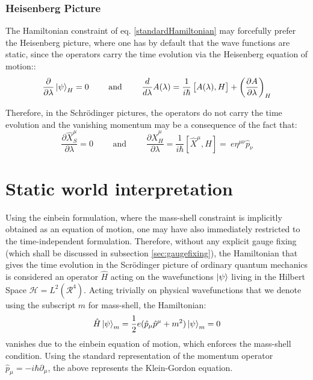 \documentclass[a4paper,10pt]{article}
\numberwithin{equation}{section}
\begin{document}
\subsubsection{Heisenberg Picture}

The Hamiltonian constraint of eq. \ref{standardHamiltonian} may forcefully prefer the Heisenberg picture, where one has by default that the wave functions are static, since the operators carry the time evolution via the Heisenberg equation of motion::
\begin{equation}
    \frac{\partial}{\partial \lambda} \ket{\psi}_H =0  \qquad \text{ and } \qquad \frac{d}{d\lambda}A(\lambda) = \frac{1}{i\hbar} \left[A(\lambda), H\right] + \left(\frac{\partial A}{\partial \lambda} \right)_H
    \label{heisenbergpicture}
\end{equation}


Therefore, in the Schr{\"o}dinger pictures, the operators do not carry the time evolution and the vanishing momentum may be a consequence of the fact that:
\begin{equation}
    \frac{\partial \hat{X}_S^\mu}{\partial \lambda} = 0 \qquad \text{ and } \qquad  \frac{\partial \hat{X}_H^\mu}{\partial \lambda} = \frac{1}{i\hbar} \left[ \hat{X}^\mu, H \right]=  \ e \eta^{\mu\nu} \hat{p}_\nu
\end{equation}

\newpage

\section{Static world interpretation}
\label{sec:staticworldinterpretation}
Using the einbein formulation, where the mass-shell constraint is implicitly obtained as an equation of motion, one may have also immediately restricted to the time-independent formulation. Therefore, without any explicit gauge fixing (which shall be discussed in subsection \ref{sec:gaugefixing}), the Hamiltonian that gives the time evolution in the Scr{\"o}dinger picture of ordinary quantum mechanics is considered an operator $\hat{H}$ acting on the wavefunctions $\ket{\psi}$ living in the Hilbert Space $\mathcal{H}= L^2(\mathcal{R}^4)$. Acting trivially on physical wavefunctions that we denote using the subscript $m$ for mass-shell, the Hamiltonian:
\begin{equation}
    \hat{H} \ket{\psi}_m = \frac{1}{2}e ( \hat{p}_\mu \hat{p}^\mu + m^2) \ket{\psi}_m =  0
    \label{hamiltonianquantumconstraint}
\end{equation}
vanishes due to the einbein equation of motion, which enforces the mass-shell condition. Using the standard representation of the momentum operator $\hat{p}_\mu = - i \hbar \partial_\mu$, the above represents the Klein-Gordon equation.
\end{document}
